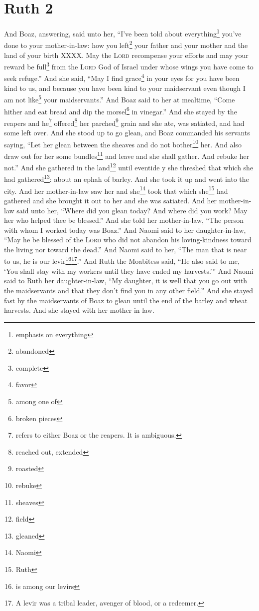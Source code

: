 \section{Ruth 2}\label{Ruth 2}
\begin{enumerate}
     And Boaz, answering, said unto her, ``I've been told about everything\footnote{emphasis on everything} you've done to your mother-in-law: how you left\footnote{abandoned} your father and your mother and the land of your birth XXXX.%
     May the \textsc{Lord} recompense your efforts and may your reward be full\footnote{complete} from the \textsc{Lord} God of Israel under whose wings you have come to seek refuge.''%
     And she said, ``May I find grace\footnote{favor} in your eyes for you have been kind to us, and because you have been kind to your maidservant even though I am not like\footnote{among one of} your maidservants.''%
     And Boaz said to her at mealtime, ``Come hither and eat bread and dip the morsel\footnote{broken pieces} in vinegar.'' And she stayed by the reapers and he\footnote{refers to either Boaz or the reapers. It is ambiguous.} offered\footnote{reached out, extended} her parched\footnote{roasted} grain and she ate, was satiated, and had some left over.%
     And she stood up to go glean, and Boaz commanded his servants saying, ``Let her glean between the sheaves and do not bother\footnote{rebuke} her.%
     And also draw out for her some bundles\footnote{sheaves} and leave and she shall gather. And rebuke her not.''%
     And she gathered in the land\footnote{field} until eventide y she threshed that which she had gathered\footnote{gleaned}: about an ephah of barley.%
     And she took it up and went into the city. And her mother-in-law saw her and she\footnote{Naomi} took that which she\footnote{Ruth} had gathered and she brought it out to her and she was satiated.%
     And her mother-in-law said unto her, ``Where did you glean today? And where did you work? May her who helped thee be blessed.'' And she told her mother-in-law, ``The person with whom I worked today was Boaz.''%
     And Naomi said to her daughter-in-law, ``May he be blessed of the \textsc{Lord} who did not abandon his loving-kindness toward the living nor toward the dead.'' And Naomi said to her, ``The man that is near to us, he is our levir\footnote{is among our levirs}\footnote{A levir was a tribal leader, avenger of blood, or a redeemer.}.''%
     And Ruth the Moabitess said, ``He also said to me, `You shall stay with my workers until they have ended my harvests.'''%
     And Naomi said to Ruth her daughter-in-law, ``My daughter, it is well that you go out with the maidservants and that they don't find you in any other field.''%
     And she stayed fast by the maidservants of Boaz to glean until the end of the barley and wheat harvests. And she stayed with her mother-in-law.%
\end{enumerate}
